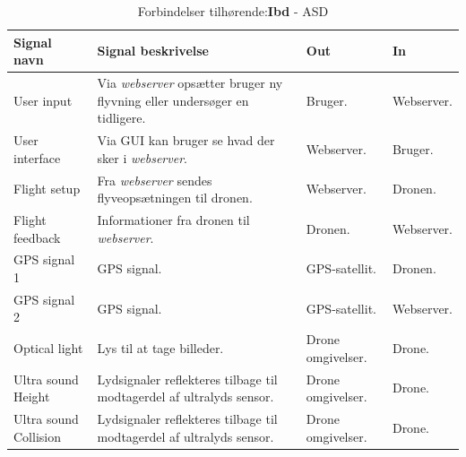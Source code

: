 \begin{table}[H]
	\centering
		\begin{tabular}{|p{2.6 cm}|p{}|p{2,2 cm}|p{}|} 
		\hline
			\textbf{Signal navn} 	& \textbf{Signal beskrivelse}		& \textbf{Out} 				& \textbf{In}     \\ \hline
			User input 			& Via \textit{webserver} opsætter bruger ny flyvning eller undersøger en tidligere. & Bruger. 		& Webserver.			    \\ \hline
			User interface 		& Via GUI kan bruger se \newline hvad der sker i \textit{webserver}.	& Webserver.			& Bruger.				\\ \hline
			Flight setup		& Fra \textit{webserver} sendes \newline flyveopsætningen til dronen.	& Webserver.	& Dronen.	\\ \hline
			Flight feedback		& Informationer fra \newline dronen til \textit{webserver}.	& 	Dronen.		& Webserver.			    \\ \hline
			GPS signal 1		& GPS signal.	& GPS-satellit.			& Dronen.				\\ \hline
			GPS signal 2		& GPS signal.	& GPS-satellit.				& Webserver.	\\ \hline  
			Optical light		& Lys til at tage billeder.	& Drone \newline omgivelser.				& Drone.	\\ \hline 
			Ultra sound \newline Height		& Lydsignaler reflekteres tilbage \newline til modtagerdel af ultralyds sensor.	& Drone \newline omgivelser.				& Drone.	\\ \hline 
			Ultra sound \newline Collision		& Lydsignaler reflekteres tilbage \newline til modtagerdel af ultralyds sensor.	& Drone \newline omgivelser.				& Drone.	\\ \hline 
		\end{tabular}
	\caption{Forbindelser tilhørende:\textbf{Ibd} - ASD}
	\label{tab:IBD1}
\end{table}

